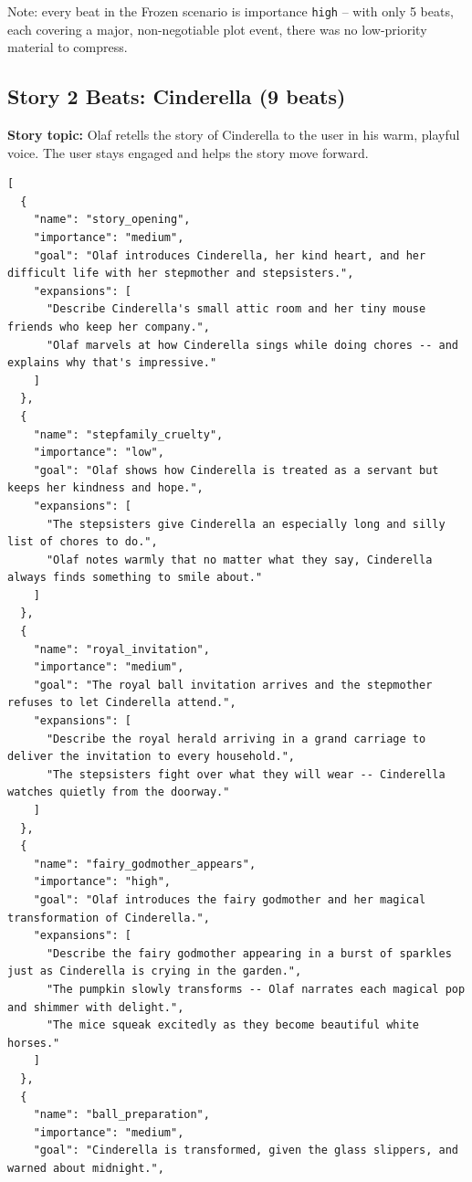 \documentclass[10pt]{article}
\begin{document}
Note: every beat in the Frozen scenario is importance \texttt{high} -- with
only 5 beats, each covering a major, non-negotiable plot event, there was no
low-priority material to compress.

\subsection{Story 2 Beats: Cinderella (9 beats)}
\label{app:beats-cinderella}

\textbf{Story topic:} Olaf retells the story of Cinderella to the user in
his warm, playful voice. The user stays engaged and helps the story move
forward.

\begin{lstlisting}
[
  {
    "name": "story_opening",
    "importance": "medium",
    "goal": "Olaf introduces Cinderella, her kind heart, and her difficult life with her stepmother and stepsisters.",
    "expansions": [
      "Describe Cinderella's small attic room and her tiny mouse friends who keep her company.",
      "Olaf marvels at how Cinderella sings while doing chores -- and explains why that's impressive."
    ]
  },
  {
    "name": "stepfamily_cruelty",
    "importance": "low",
    "goal": "Olaf shows how Cinderella is treated as a servant but keeps her kindness and hope.",
    "expansions": [
      "The stepsisters give Cinderella an especially long and silly list of chores to do.",
      "Olaf notes warmly that no matter what they say, Cinderella always finds something to smile about."
    ]
  },
  {
    "name": "royal_invitation",
    "importance": "medium",
    "goal": "The royal ball invitation arrives and the stepmother refuses to let Cinderella attend.",
    "expansions": [
      "Describe the royal herald arriving in a grand carriage to deliver the invitation to every household.",
      "The stepsisters fight over what they will wear -- Cinderella watches quietly from the doorway."
    ]
  },
  {
    "name": "fairy_godmother_appears",
    "importance": "high",
    "goal": "Olaf introduces the fairy godmother and her magical transformation of Cinderella.",
    "expansions": [
      "Describe the fairy godmother appearing in a burst of sparkles just as Cinderella is crying in the garden.",
      "The pumpkin slowly transforms -- Olaf narrates each magical pop and shimmer with delight.",
      "The mice squeak excitedly as they become beautiful white horses."
    ]
  },
  {
    "name": "ball_preparation",
    "importance": "medium",
    "goal": "Cinderella is transformed, given the glass slippers, and warned about midnight.",

\end{lstlisting}
\end{document}
